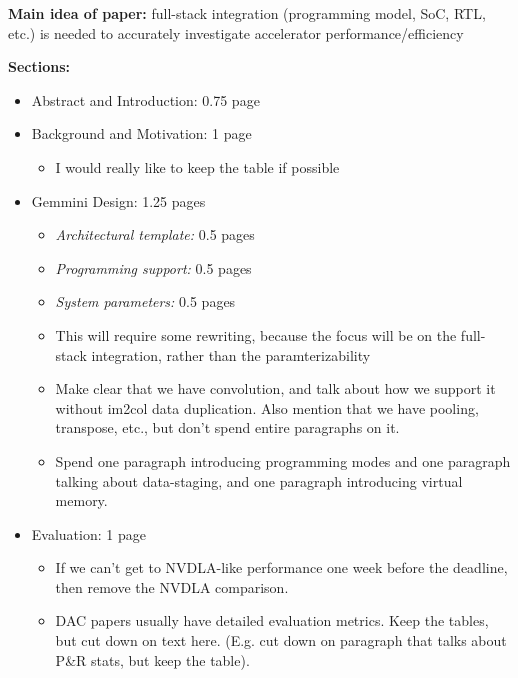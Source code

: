 
\textbf{Main idea of paper:} full-stack integration (programming model, SoC, RTL, etc.) is needed to accurately investigate accelerator performance/efficiency

\textbf{Sections:}
\begin{itemize}
    \item Abstract and Introduction: 0.75 page
    \item Background and Motivation: 1 page
        \begin{itemize}
            \item I would really like to keep the table if possible
        \end{itemize}
    \item Gemmini Design: 1.25 pages
        \begin{itemize}
            \item \textit{Architectural template:} 0.5 pages
            \item \textit{Programming support:} 0.5 pages
            \item \textit{System parameters:} 0.5 pages
            \item This will require some rewriting, because the focus will be on the full-stack integration, rather than the paramterizability
            \item Make clear that we have convolution, and talk about how we support it without im2col data duplication. Also mention that we have pooling, transpose, etc., but don't spend entire paragraphs on it.
            \item Spend one paragraph introducing programming modes and one paragraph talking about data-staging, and one paragraph introducing virtual memory.
        \end{itemize}
    \item Evaluation: 1 page
        \begin{itemize}
            \item If we can't get to NVDLA-like performance one week before the deadline, 
            then remove the NVDLA comparison.
            \item DAC papers usually have detailed evaluation metrics. Keep the tables, but cut down on text here. (E.g. cut down on paragraph that talks about P\&R stats, but keep the table).
        \end{itemize}

\end{itemize}
